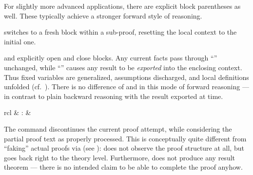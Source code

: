 \begin{isabellebody}
\begin{isamarkuptext}
  For slightly more advanced applications, there are explicit block
  parentheses as well.  These typically achieve a stronger forward
  style of reasoning.

  \begin{description}

  \item \hyperlink{command.next}{\mbox{}} switches to a fresh block within a
  sub-proof, resetting the local context to the initial one.

  \item \hyperlink{command.braceleft}{\mbox{}} and \hyperlink{command.braceright}{\mbox{}} explicitly open and close
  blocks.  Any current facts pass through ``\hyperlink{command.braceleft}{\mbox{}}''
  unchanged, while ``\hyperlink{command.braceright}{\mbox{}}'' causes any result to be
  \emph{exported} into the enclosing context.  Thus fixed variables
  are generalized, assumptions discharged, and local definitions
  unfolded (cf.\ ).  There is no difference
  of \hyperlink{command.assume}{\mbox{}} and \hyperlink{command.presume}{\mbox{}} in this mode of
  forward reasoning --- in contrast to plain backward reasoning with
  the result exported at \hyperlink{command.show}{\mbox{}} time.

  \end{description}%
\end{isamarkuptext}%
\isamarkuptrue%
%
\isamarkuptrue%
%
\begin{isamarkuptext}%
\begin{matharray}{rcl}
    \hypertarget{command.oops}{\hyperlink{command.oops}{\mbox{}}} & : &  \\
  \end{matharray}

  The \hyperlink{command.oops}{\mbox{}} command discontinues the current proof
  attempt, while considering the partial proof text as properly
  processed.  This is conceptually quite different from ``faking''
  actual proofs via \hyperlink{command.sorry}{\mbox{}} (see
  ): \hyperlink{command.oops}{\mbox{}} does not observe the
  proof structure at all, but goes back right to the theory level.
  Furthermore, \hyperlink{command.oops}{\mbox{}} does not produce any result theorem
  --- there is no intended claim to be able to complete the proof
  anyhow.


\end{isamarkuptext}
\end{isabellebody}
